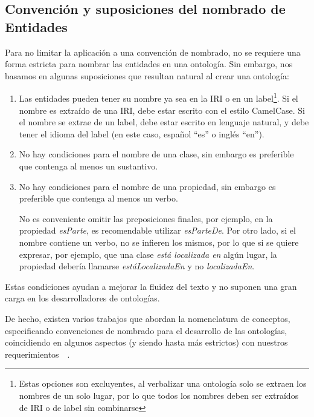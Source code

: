 \subsection{Convención y suposiciones del nombrado de Entidades}
Para no limitar la aplicación a una convención de nombrado, no se requiere una forma estricta para nombrar las entidades en una ontología. Sin embargo, nos basamos en algunas suposiciones que resultan natural al crear una ontología:
\begin{enumerate}
    \item Las entidades pueden tener su nombre ya sea en la IRI o en un label\footnote{Estas opciones son excluyentes, al verbalizar una ontología solo se extraen los nombres de un solo lugar, por lo que todos los nombres deben ser extraídos de IRI o de label sin combinarse}. Si el nombre es extraído de una IRI, debe estar escrito con el estilo CamelCase. Si el nombre se extrae de un label, debe estar escrito en lenguaje natural, y debe tener el idioma del label (en este caso, español ``es'' o inglés ``en'').
    \item No hay condiciones para el nombre de una clase, sin embargo es preferible que contenga al menos un sustantivo.
    \item No hay condiciones para el nombre de una propiedad, sin embargo es preferible que contenga al menos un verbo. 
    
    No es conveniente omitir las preposiciones finales, por ejemplo, en la propiedad \emph{esParte}, es recomendable utilizar \emph{esParteDe}. Por otro lado, si el nombre contiene un verbo, no se infieren los mismos, por lo que si se quiere expresar, por ejemplo, que una clase \emph{está localizada en} algún lugar, la propiedad debería llamarse \emph{estáLocalizadaEn} y no \emph{localizadaEn}. 
    
\end{enumerate}

Estas condiciones ayudan a mejorar la fluidez del texto y no suponen una gran carga en los desarrolladores de ontologías.

De hecho, existen varios trabajos que abordan la nomenclatura de conceptos, especificando convenciones de nombrado para el desarrollo de las ontologías, coincidiendo en algunos aspectos (y siendo hasta más estrictos) con nuestros requerimientos~\cite{montiel2011style}~\cite{OntoCheck}.

